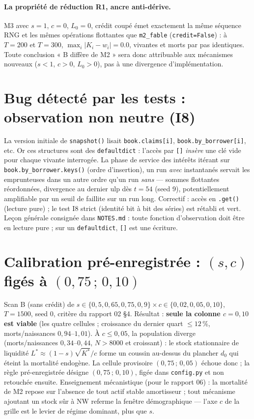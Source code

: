\documentclass[11pt,a4paper]{article}
\newcommand{\NW}{\mathrm{NW}}
\newcommand{\code}[1]{\texttt{#1}}
\begin{document}
\paragraph{La propriété de réduction R1, ancre anti-dérive.} M3 avec
$s{=}1$, $c{=}0$, $L_0{=}0$, crédit coupé émet exactement la même séquence
RNG et les mêmes opérations flottantes que \code{m2\_fable}
(\code{credit=False}) : à $T{=}200$ et $T{=}300$, $\max_i |K_i - w_i| = 0.0$,
vivantes et morts par pas identiques. Toute conclusion « B diffère de M2 »
sera donc attribuable aux mécanismes nouveaux ($s<1$, $c>0$, $L_0>0$), pas à
une divergence d'implémentation.

\section{Bug détecté par les tests : observation non neutre (I8)}

La version initiale de \code{snapshot()} lisait \code{book.claims[i]},
\code{book.by\_borrower[i]}, etc. Or ces structures sont des
\code{defaultdict} : l'accès par \code{[]} \emph{insère} une clé vide pour
chaque vivante interrogée. La phase de service des intérêts itérant sur
\code{book.by\_borrower.keys()} (ordre d'insertion), un run \emph{avec}
instantanés servait les emprunteuses dans un autre ordre qu'un run
\emph{sans} --- sommes flottantes réordonnées, divergence au dernier ulp dès
$t{=}54$ (seed 9), potentiellement amplifiable par un seuil de faillite sur
un run long. Correctif : accès en \code{.get()} (lecture pure) ; le test I8
strict (identité bit à bit des séries) est rétabli et vert. Leçon
générale consignée dans \code{NOTES.md} : toute fonction d'observation doit
être en lecture pure ; sur un \code{defaultdict}, \code{[]} est une
écriture.

\section{Calibration pré-enregistrée : $(s, c)$ figés à $(0{,}75\,;\,0{,}10)$}

Scan B (sans crédit) de $s \in \{0{,}5, 0{,}65, 0{,}75, 0{,}9\} \times
c \in \{0{,}02, 0{,}05, 0{,}10\}$, $T{=}1500$, seed 0, critère du rapport 02
§4. Résultat : \textbf{seule la colonne $c = 0{,}10$ est viable} (les quatre
cellules ; croissance du dernier quart $\le 12\,\%$, morts/naissances
$0{,}94$--$1{,}01$). À $c \le 0{,}05$, la population diverge
(morts/naissances $0{,}34$--$0{,}44$, $N > 8000$ et croissant) : le stock
stationnaire de liquidité $L^* \approx (1{-}s)\sqrt{K^*}/c$ forme un coussin
au-dessus du plancher $d_0$ qui éteint la mortalité endogène. La cellule
provisoire $(0{,}75\,;\,0{,}05)$ échoue donc ; la règle pré-enregistrée
désigne $(0{,}75\,;\,0{,}10)$, figée dans \code{config.py} et non retouchée
ensuite. Enseignement mécanistique (pour le rapport 06) : la mortalité de M2
repose sur l'absence de tout actif stable amortisseur ; tout mécanisme
ajoutant un stock sûr à $\NW$ referme la fenêtre démographique --- l'axe $c$
de la grille est le levier de régime dominant, plus que $s$.
\end{document}
